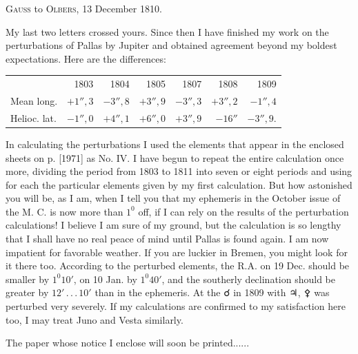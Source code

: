 \par\bigskip
{}
\begin{center}
\textsc{Gauss} to \textsc{Olbers}, 13 December 1810.
\end{center}
\noindent\hspace*{\parindent}My last two letters crossed yours. Since then I have finished my work on the perturbations of Pallas by Jupiter and obtained agreement beyond my boldest expectations. Here are the differences:
\begin{center}\begingroup\small\setlength{\tabcolsep}{4pt}
\begin{tabular}{lrrrrrr}
& 1803 & 1804 & 1805 & 1807 & 1808 & 1809\\
Mean long. & \(+1''{,}3\) & \(-3''{,}8\) & \(+3''{,}9\) & \(-3''{,}3\) & \(+3''{,}2\) & \(-1''{,}4\)\\
Helioc. lat. & \(-1''{,}0\) & \(+4''{,}1\) & \(+6''{,}0\) & \(+3''{,}9\) & \(-16''\) & \(-3''{,}9.\)\\
\end{tabular}\endgroup\end{center}
\par
\noindent\hspace*{\parindent}In calculating the perturbations I used the elements that appear in the enclosed sheets\HistoricalNoteEight{Vol. VI, p. 63.]} on p. [1971] as No. IV. I have begun to repeat the entire calculation once more, dividing the period from 1803 to 1811 into seven or eight periods and using for each the particular elements given by my first calculation. But how astonished you will be, as I am, when I tell you that my ephemeris in the October issue of the M. C. is now more than \(1^{0}\) off, if I can rely on the results of the perturbation calculations! I believe I am sure of my ground, but the calculation is so lengthy that I shall have no real peace of mind until Pallas is found again. I am now impatient for favorable weather. If you are luckier in Bremen, you might look for it there too. According to the perturbed elements, the R.A. on 19 Dec. should be smaller by \(1^{0}10'\), on 10 Jan. by \(1^{0}40'\), and the southerly declination should be greater by \(12'\,.\,.\,.\,10'\) than in the ephemeris. At the {\AstroSymbols ☌} in 1809 with {\AstroSymbols ♃}, {\AstroSymbols ⚴} was perturbed very severely. If my calculations are confirmed to my satisfaction here too, I may treat Juno and Vesta similarly.
\par
\noindent\hspace*{\parindent}The paper whose notice I enclose will soon be printed.\quad.\quad.\quad.\quad.\quad.
\par
